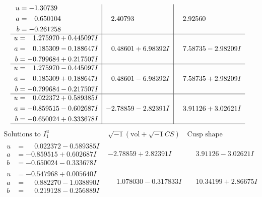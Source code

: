 \documentclass[1p]{elsarticle_modified}
\theoremstyle{definition}
\newcommand{\I}{\sqrt{-1}}
\begin{document}
$$\begin{array}{c|c|c}
\begin{aligned}
u &= -1.30739\phantom{ +0.000000I} \\
a &= \phantom{-}0.650104\phantom{ +0.000000I} \\
b &= -0.261258\phantom{ +0.000000I}\end{aligned}
 & \phantom{-}2.40793\phantom{ +0.000000I} & \phantom{-}2.92560\phantom{ +0.000000I} \\ \hline\begin{aligned}
u &= \phantom{-}1.275970 + 0.445097 I \\
a &= \phantom{-}0.185309 - 0.188647 I \\
b &= -0.799684 + 0.217507 I\end{aligned}
 & \phantom{-}0.48601 + 6.98392 I & \phantom{-}7.58735 - 2.98209 I \\ \hline\begin{aligned}
u &= \phantom{-}1.275970 - 0.445097 I \\
a &= \phantom{-}0.185309 + 0.188647 I \\
b &= -0.799684 - 0.217507 I\end{aligned}
 & \phantom{-}0.48601 - 6.98392 I & \phantom{-}7.58735 + 2.98209 I \\ \hline\begin{aligned}
u &= \phantom{-}0.022372 + 0.589385 I \\
a &= -0.859515 - 0.602687 I \\
b &= -0.650024 + 0.333678 I\end{aligned}
 & -2.78859 - 2.82391 I & \phantom{-}3.91126 + 3.02621 I\\
 \hline 
 \end{array}$$\newpage$$\begin{array}{c|c|c}  
\text{Solutions to }I^u_{1}& \I (\text{vol} + \sqrt{-1}CS) & \text{Cusp shape}\\
 \hline 
\begin{aligned}
u &= \phantom{-}0.022372 - 0.589385 I \\
a &= -0.859515 + 0.602687 I \\
b &= -0.650024 - 0.333678 I\end{aligned}
 & -2.78859 + 2.82391 I & \phantom{-}3.91126 - 3.02621 I \\ \hline\begin{aligned}
u &= -0.547968 + 0.005640 I \\
a &= \phantom{-}0.882270 - 1.038890 I \\
b &= \phantom{-}0.219128 - 0.256889 I\end{aligned}
 & \phantom{-}1.078030 - 0.317833 I & \phantom{-}10.34199 + 2.86675 I \\ \hline\begin{aligned}

\end{aligned}
\end{array}$$
\end{document}
